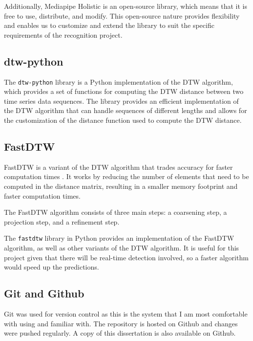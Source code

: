 \documentclass[final,rdr32.tex]{subfiles}
\begin{document}
Additionally, Mediapipe Holistic is an open-source library, which means that it is free to use, distribute, and modify. This open-source nature provides flexibility and enables us to customize and extend the library to suit the specific requirements of the recognition project.

\subsection{dtw-python}

The \verb|dtw-python| library is a Python implementation of the DTW algorithm, which provides a set of functions for computing the DTW distance between two time series data sequences. The library provides an efficient implementation of the DTW algorithm that can handle sequences of different lengths and allows for the customization of the distance function used to compute the DTW distance.

\subsection{FastDTW}

FastDTW is a variant of the DTW algorithm that trades accuracy for faster computation times \cite{salvador2007toward}. It works by reducing the number of elements that need to be computed in the distance matrix, resulting in a smaller memory footprint and faster computation times.

The FastDTW algorithm consists of three main steps: a coarsening step, a projection step, and a refinement step.

The \verb|fastdtw| library in Python provides an implementation of the FastDTW algorithm, as well as other variants of the DTW algorithm. It is useful for this project given that there will be real-time detection involved, so a faster algorithm would speed up the predictions.

\subsection{Git and Github}

Git was used for version control as this is the system that I am most comfortable with using and familiar with. The repository is hosted on Github and changes were pushed regularly. A copy of this dissertation is also available on Github.
\end{document}
